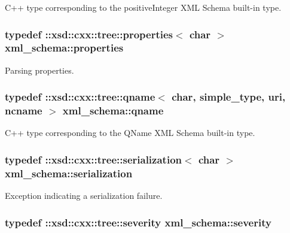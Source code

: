 C++ type corresponding to the positive\+Integer X\+M\+L Schema built-\/in type. 

\hypertarget{namespacexml__schema_aba199bc39c8b21c427369c27d2bcfc8c}{
\subsubsection[{properties}]{\setlength{\rightskip}{0pt plus 5cm}typedef \+::xsd\+::cxx\+::tree\+::properties$<$ char $>$ {\bf xml\+\_\+schema\+::properties}}}\label{namespacexml__schema_aba199bc39c8b21c427369c27d2bcfc8c}


Parsing properties. 

\hypertarget{namespacexml__schema_af47d5d85d1b1714be503513b1c09c079}{
\subsubsection[{qname}]{\setlength{\rightskip}{0pt plus 5cm}typedef \+::xsd\+::cxx\+::tree\+::qname$<$ char, {\bf simple\+\_\+type}, {\bf uri}, {\bf ncname} $>$ {\bf xml\+\_\+schema\+::qname}}}\label{namespacexml__schema_af47d5d85d1b1714be503513b1c09c079}


C++ type corresponding to the Q\+Name X\+M\+L Schema built-\/in type. 

\hypertarget{namespacexml__schema_a40e04a11c9e6204762591b4de3755899}{
\subsubsection[{serialization}]{\setlength{\rightskip}{0pt plus 5cm}typedef \+::xsd\+::cxx\+::tree\+::serialization$<$ char $>$ {\bf xml\+\_\+schema\+::serialization}}}\label{namespacexml__schema_a40e04a11c9e6204762591b4de3755899}


Exception indicating a serialization failure. 

\hypertarget{namespacexml__schema_aaac8e21420b35e58ad94533db40ccf41}{
\subsubsection[{severity}]{\setlength{\rightskip}{0pt plus 5cm}typedef \+::xsd\+::cxx\+::tree\+::severity {\bf xml\+\_\+schema\+::severity}}}\label{namespacexml__schema_aaac8e21420b35e58ad94533db40ccf41}


